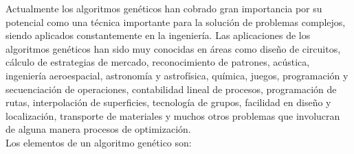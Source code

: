 \documentclass{article}
\begin{document}
Actualmente los algoritmos genéticos han cobrado gran
importancia por su potencial como una técnica importante para la solución de problemas
complejos, siendo aplicados constantemente en la ingeniería. Las aplicaciones de los
algoritmos genéticos han sido muy conocidas en áreas como diseño de circuitos, cálculo
de estrategias de mercado, reconocimiento de patrones, acústica, ingeniería
aeroespacial, astronomía y astrofísica, química, juegos, programación y secuenciación
de operaciones, contabilidad lineal de procesos, programación de rutas, interpolación de
superficies, tecnología de grupos, facilidad en diseño y localización, transporte de
materiales y muchos otros problemas que involucran de alguna manera procesos de
optimización.\\

Los elementos de un algoritmo genético son:
\end{document}
